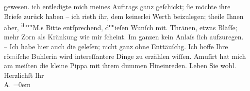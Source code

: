 \begin{ledgroupsized}[t]{13cm}
{{{                  gewesen.}}}\label{K_L02981-2h}{\dotstwo} ich entledigte mich meines Auftrags ganz geſchickt; ſie
                  {\pb}möchte ihre Briefe zurück haben – ich
               rieth ihr, dem keinerlei Werth beizulegen; theile Ihnen aber, \substVorne{}\textsuperscript{ihrer}\substDazwischen{}M.s
               \substHinten{} Bitte entſprechend, d\substVorne{}\textsuperscript{en}\substDazwischen{}ie\substHinten{}ſen Wunſch mit. Thränen, etwas Bläſſe; mehr Zorn als Kränkung wie mir
               ſcheint. Im ganzen kein Anlaſs ſich aufzuregen.\pend
           \pstart
           – Ich habe hier auch die \label{K_L02981-3v}\label{K_L02981-3h} geleſen; nicht ganz ohne Enttäuſchg. Ich hoffe Ihre
               rö\textcolor{gray}{mi}ſche Buhlerin wird intereſſantere Dinge zu erzählen wiſſen. Amuſirt hat mich am
               meiſten die kleine Pippa mit
               ihrem dummen Hineinreden.\pend
           \pstart
           Leben Sie wohl. Herzlichſt Ihr {\\[\baselineskip]}\spacefill\mbox{A.}\pend
           \leftskip=0em{}
         
         \endnumbering{}\end{ledgroupsized}  \newcommand{\dateiname}{L02981}\newcommand{\titel}{Arthur Schnitzler an Felix Salten, 4. 3. 1903}\newcommand{\editorInnen}{Martin Anton Müller und Laura Untner}
      